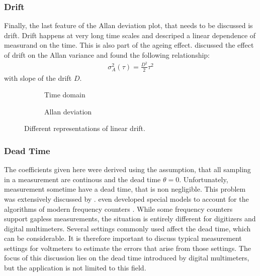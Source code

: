 \clearpage
\subsubsection{Drift}
Finally, the last feature of the Allan deviation plot, that needs to be discussed is drift. Drift happens at very long time scales and descriped a linear dependence of measurand on the time. This is also part of the ageing effect. \citeauthor{adev_drift} discussed the effect of drift \cite{adev_drift} on the Allan variance and found the following relationship:
\begin{align}
    \sigma_A^2(\tau) = \frac{D^2}{2} \tau^2
\end{align}
with slope of the drift $D$.

\begin{figure}[ht]
    \centering
    \begin{subfigure}{0.32\linewidth}
        \centering
        \scalebox{0.75}{%
            
        } %
        \caption{Time domain}
        \label{fig:drift_time}
    \end{subfigure}
    \begin{subfigure}{0.32\linewidth}
        \centering
        \scalebox{0.75}{%
            
        } %
        \caption{Allan deviation}
        \label{fig:drift_adev}
    \end{subfigure}
    \caption{Different representations of linear drift.}
    \label{fig:drift_noise_simulated}
\end{figure}

\clearpage
\subsubsection{Dead Time}
\label{sec:dead_time}
The coefficients given here were derived using the assumption, that all sampling in a measurement are continous and the dead time $\theta = 0$. Unfortunately, measurement sometime have a dead time, that is non negligible. This problem was extensively discussed by \citeauthor{psd_to_adev} \cite{psd_to_adev}. \citeauthor{adev_frequency_counter} even developed special models to account for the algorithms of modern frequency counters \cite{adev_frequency_counter}. While some frequency counters support gapless measurements, the situation is entirely different for digitizers and digital multimeters. Several settings commonly used affect the dead time, which can be considerable. It is therefore important to discuss typical measurement settings for voltmeters to estimate the errors that arise from those settings. The focus of this discussion lies on the dead time introduced by digital multimeters, but the application is not limited to this field.

